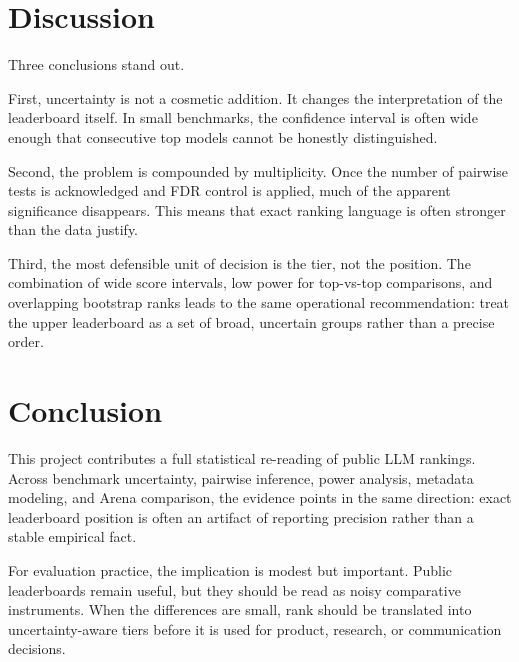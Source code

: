 \documentclass[11pt,a4paper]{article}
\begin{document}
\section{Discussion}
Three conclusions stand out.

First, uncertainty is not a cosmetic addition. It changes the interpretation of the leaderboard itself. In small benchmarks, the confidence interval is often wide enough that consecutive top models cannot be honestly distinguished.

Second, the problem is compounded by multiplicity. Once the number of pairwise tests is acknowledged and FDR control is applied, much of the apparent significance disappears. This means that exact ranking language is often stronger than the data justify.

Third, the most defensible unit of decision is the tier, not the position. The combination of wide score intervals, low power for top-vs-top comparisons, and overlapping bootstrap ranks leads to the same operational recommendation: treat the upper leaderboard as a set of broad, uncertain groups rather than a precise order.

\section{Conclusion}
This project contributes a full statistical re-reading of public LLM rankings. Across benchmark uncertainty, pairwise inference, power analysis, metadata modeling, and Arena comparison, the evidence points in the same direction: exact leaderboard position is often an artifact of reporting precision rather than a stable empirical fact.

For evaluation practice, the implication is modest but important. Public leaderboards remain useful, but they should be read as noisy comparative instruments. When the differences are small, rank should be translated into uncertainty-aware tiers before it is used for product, research, or communication decisions.



\end{document}
